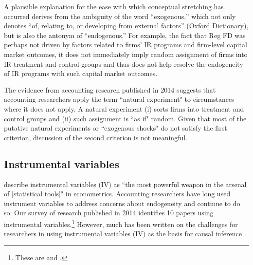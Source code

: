 \documentclass[11pt,reqno,titlepage]{amsart}
\begin{document}
\begin{doublespace}
A plausible explanation for the ease with which conceptual stretching has occurred derives from the ambiguity of the word ``exogenous,'' which not only denotes  ``of, relating to, or developing from external factors'' (Oxford Dictionary), but is also the antonym of ``endogenous.''
For example, the fact that Reg FD was perhaps not driven by factors related to firms' IR programs and firm-level capital market outcomes, it does not immediately imply random assignment of firms into IR treatment and control groups and thus does not help resolve the endogeneity of IR programs with such capital market outcomes.

The evidence from accounting research published in 2014 suggests that accounting researchers apply the term ``natural experiment" to circumstances where it does not apply.
A natural experiment (i) sorts firms into treatment and control groups and (ii) such assignment is ``as if" random.
Given that most of the putative natural experiments or ``exogenous shocks" do not satisfy the first criterion, discussion of the second criterion is not meaningful.






\subsection{Instrumental variables}
\citet[p.114]{Angrist:2008vk} describe instrumental variables (IV) as ``the most powerful weapon in the arsenal of [statistical tools]" in econometrics. 
Accounting researchers have long used instrument variables to address concerns about endogeneity \citep{Larcker:2010fq} and continue to do so.  Our survey of research published in 2014 identifies 10 papers using instrumental variables.\footnote{These are \citet{Cannon:2014im,Cohen:2014jl,Kim:2014fm,Vermeer:2014bs,Fox:2014io,Guedhami:2013cj,Houston:2014hv,deFranco:2014ct,Erkens:2014hj} and \citet{Correia:2014fp}.}
However, much has been written on the challenges for researchers in using instrumental variables (IV) as the basis for causal inference \citep[e.g.,][]{Roberts:2013cz}. 


\end{doublespace}
\end{document}
